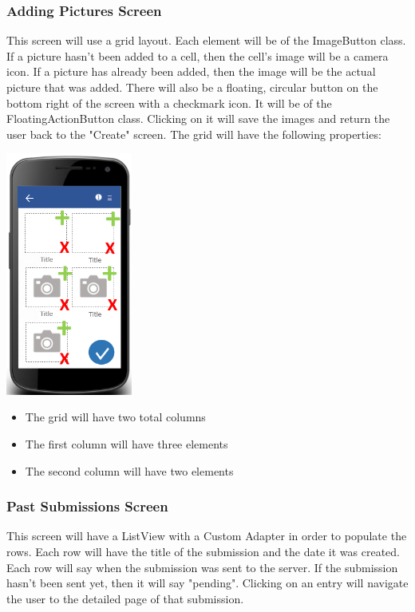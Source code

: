\documentclass[onecolumn, draftclsnofoot,10pt, compsoc]{IEEEtran}
\begin{document}
\subsubsection{Adding Pictures Screen}
This screen will use a grid layout. Each element will be of the ImageButton class. If a picture hasn't been added to a cell, then the cell's image will be a camera icon. If a picture has already been added, then the image will be the actual picture that was added. There will also be a floating, circular button on the bottom right of the screen with a checkmark icon. It will be of the FloatingActionButton class. Clicking on it will save the images and return the user back to the "Create" screen. The grid will have the following properties:
\newline
\begin{center}
\includegraphics[height=8cm]{picturesscreen.png}
\end{center}

\begin{itemize}
\item The grid will have two total columns
\item The first column will have three elements
\item The second column will have two elements
\end{itemize}

\subsubsection{Past Submissions Screen}
This screen will have a ListView with a Custom Adapter in order to populate the rows. Each row will have the title of the submission and the date it was created. Each row will say when the submission was sent to the server. If the submission hasn't been sent yet, then it will say "pending". Clicking on an entry will navigate the user to the detailed page of that submission.
\end{document}
